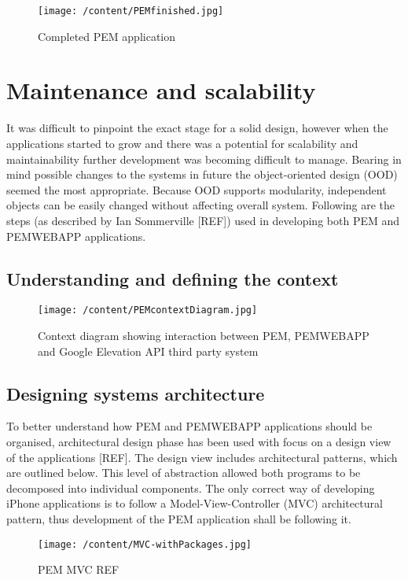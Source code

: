 \documentclass[12pt, a4paper]{report}   %
\begin{document}
\begin{enumerate}
\begin{figure}[H]
  \centering
	\texttt{[image: /content/PEMfinished.jpg]}
	  \caption{Completed PEM application}
\end{figure}


\clearpage
\section{Maintenance and scalability}
It was difficult to pinpoint the exact stage for a solid design, however when the applications started to grow and there was a potential for scalability and maintainability further development was becoming difficult to manage. Bearing in mind possible changes to the systems in future the object-oriented design (OOD) seemed the most appropriate. Because OOD supports modularity, independent objects can be easily changed without affecting overall system. Following are the steps (as described by Ian Sommerville [REF]) used in developing both PEM and PEMWEBAPP applications.


\subsection{Understanding and defining the context}
	
	
\begin{figure}[H]
  \centering
	\texttt{[image: /content/PEMcontextDiagram.jpg]}
	  \caption{Context diagram showing interaction between PEM, PEMWEBAPP and Google Elevation API third party system}
\end{figure}


\subsection{Designing systems architecture}
To better understand how PEM and PEMWEBAPP applications should be organised, architectural design phase has been used with focus on a design view of the applications [REF]. The design view includes architectural patterns, which are outlined below. This level of abstraction allowed both programs to be decomposed into individual components. The only correct way of developing iPhone applications is to follow a Model-View-Controller (MVC) architectural pattern, thus development of the PEM application shall be following it.\\
	

\begin{figure}[H]
  \centering
	\texttt{[image: /content/MVC-withPackages.jpg]}
	  \caption{PEM MVC REF}
\end{figure}



\end{enumerate}
\end{document}
